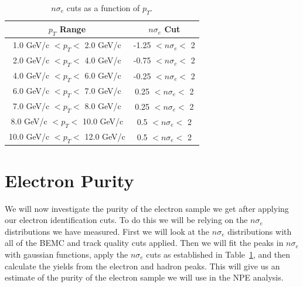 \begin{table}
\centering
\begin{tabular}{|c|c|}
\hline
$p_T$ Range            & $n\sigma_e$ Cut \\
\hline
1.0 GeV/c $< p_T <$ 2.0 GeV/c   & -1.25 $< n\sigma_e <$ 2\\
\hline
2.0 GeV/c $< p_T <$ 4.0 GeV/c   & -0.75 $< n\sigma_e <$ 2\\
\hline
4.0 GeV/c $< p_T <$ 6.0 GeV/c   & -0.25 $< n\sigma_e <$ 2\\
\hline
6.0 GeV/c $< p_T <$ 7.0 GeV/c   & 0.25 $< n\sigma_e <$ 2\\
\hline
7.0 GeV/c $< p_T <$ 8.0 GeV/c   & 0.25 $< n\sigma_e <$ 2\\
\hline
8.0 GeV/c $< p_T <$ 10.0 GeV/c   & 0.5 $< n\sigma_e <$ 2\\
\hline
10.0 GeV/c $< p_T <$ 12.0 GeV/c   & 0.5 $< n\sigma_e <$ 2\\
\hline
\end{tabular}
\caption[$n\sigma_e$ Cuts]{$n\sigma_e$ cuts as a function of $p_T$.}
\label{tab:nsigma}
\end{table}

\section{Electron Purity}

We will now investigate the purity of the electron sample we get after applying our electron identification cuts. To do this we will be relying on the $n\sigma_e$ distributions we have measured. First we will look at the $n\sigma_e$ distributions with all of the BEMC and track quality cuts applied. Then we will fit the peaks in $n\sigma_e$ with gaussian functions, apply the $n\sigma_e$ cuts as established in Table~\ref{tab:nsigma}, and then calculate the yields from the electron and hadron peaks. This will give us an estimate of the purity of the electron sample we will use in the NPE analysis.

